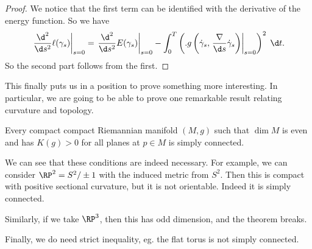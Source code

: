 \documentclass[a4paper]{article}
\begin{document}
\begin{proof}
  We notice that the first term can be identified with the derivative of the energy function. So we have
  \[
    \left.\frac{\d^2}{\d s^2} \ell(\gamma_s) \right|_{s = 0} = \left.\frac{\d^2}{\d s^2} E(\gamma_s)\right|_{s = 0} - \int_0^T \left(. g\left(\dot{\gamma}_s, \left.\frac{\nabla}{\d s} \dot{\gamma}_s\right)\right|_{s = 0}\right)^2\;\d t.
  \]
  So the second part follows from the first.
\end{proof}

This finally puts us in a position to prove something more interesting. In particular, we are going to be able to prove one remarkable result relating curvature and topology.

\begin{thm}
  Every compact compact Riemannian manifold $(M, g)$ such that $\dim M$ is even and has $K(g) > 0$ for all planes at $p \in M$ is simply connected.
\end{thm}

We can see that these conditions are indeed necessary. For example, we can consider $\RP^2 = S^2/\pm 1$ with the induced metric from $S^2$. Then this is compact with positive sectional curvature, but it is not orientable. Indeed it is simply connected.

Similarly, if we take $\RP^3$, then this has odd dimension, and the theorem breaks.

Finally, we do need strict inequality, eg. the flat torus is not simply connected.
\end{document}
